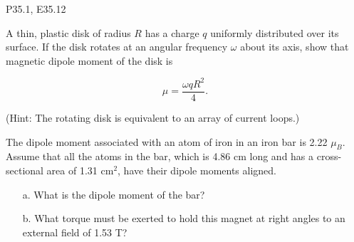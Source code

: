 \documentclass[11pt,letterpaper,boxed]{pset}
\begin{document}
    \begin{center}
        P35.1, E35.12
    \end{center}
    
    \begin{problem} [P35.1]
        A thin, plastic disk of radius $R$ has a charge $q$ uniformly distributed over its surface. If the disk rotates at an angular frequency $\omega$ about its axis, show that magnetic dipole moment of the disk is 
        
        \[\mu = \frac{\omega qR^2}{4}.\]
        
        (Hint: The rotating disk is equivalent to an array of current loops.)
    \end{problem}
    \newpage
    
    \begin{problem} [E35.12]
        The dipole moment associated with an atom of iron in an iron bar is 2.22 $\mu_B$. Assume that all the atoms in the bar, which is 4.86 cm long and has a cross-sectional area of 1.31 cm$^2$, have their dipole moments aligned.
        
        \begin{enumerate}
            \item [a.] What is the dipole moment of the bar?
            \item [b.] What torque must be exerted to hold this magnet at right angles to an external field of 1.53 T?
        \end{enumerate}
    \end{problem}
\end{document}
